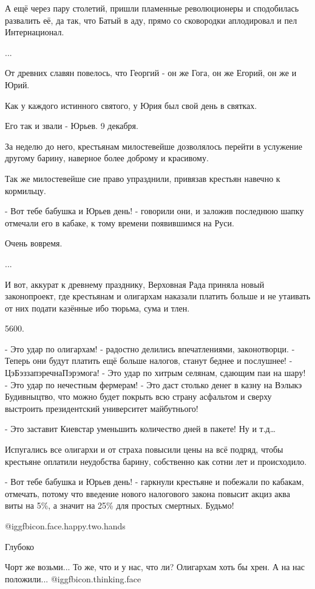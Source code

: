 А ещё через пару столетий, пришли пламенные революционеры и сподобилась
развалить её, да так, что Батый  в аду, прямо со сковородки аплодировал и пел
Интернационал.

...

От древних славян повелось, что Георгий - он же Гога, он же Егорий, он же и
Юрий.

Как у каждого истинного святого, у Юрия был свой день в святках. 

Его так и звали - Юрьев. 9 декабря.

За неделю до него, крестьянам милостевейше дозволялось перейти в услужение
другому барину, наверное более доброму и красивому.

Так же милостевейше сие право упразднили, привязав крестьян навечно к
кормильцу.

- Вот тебе бабушка и Юрьев день! - говорили они, и заложив последнюю шапку
отмечали его в кабаке, к тому времени появившимся на Руси.

Очень вовремя.

...

И вот, аккурат к древнему празднику, Верховная Рада приняла новый законопроект,
где крестьянам и олигархам наказали платить больше и не утаивать от них подати
казённые ибо тюрьма, сума и тлен.

5600.

- Это удар по олигархам! - радостно делились впечатлениями, законотворци. -
Теперь они будут платить ещё больше налогов, станут беднее и послушнее! -
ЦэБэззапэречнаПэрэмога! - Это удар по хитрым селянам, сдающим паи на шару! -
Это удар по нечестным фермерам!  - Это даст столько денег в казну на Вэлыкэ
Будивныцтво, что можно будет покрыть всю страну асфальтом и сверху выстроить
президентский университет майбутнього!

- Это заставит Киевстар уменьшить количество дней в пакете! Ну и т.д…

Испугались все олигархи и от страха повысили цены на всё подряд, чтобы
крестьяне оплатили неудобства барину, собственно как сотни лет и происходило.

- Вот тебе бабушка и Юрьев день! - гаркнули крестьяне и побежали по кабакам,
отмечать, потому что введение нового налогового закона повысит акциз аква виты
на 5\%, а значит на 25\% для простых смертных. Будьмо!

 @igg{fbicon.face.happy.two.hands} 

\begin{itemize} %
Глубоко

Чорт же возьми... То же, что и у нас, что ли? Олигархам хоть бы хрен. А на нас положили...  @igg{fbicon.thinking.face} 
\end{itemize} %
